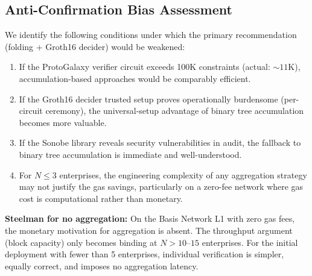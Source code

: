 \subsection{Anti-Confirmation Bias Assessment}

We identify the following conditions under which the primary
recommendation (folding + Groth16 decider) would be weakened:

\begin{enumerate}
  \item If the ProtoGalaxy verifier circuit exceeds 100K constraints
    (actual: ${\sim}11$K), accumulation-based approaches would be
    comparably efficient.
  \item If the Groth16 decider trusted setup proves operationally
    burdensome (per-circuit ceremony), the universal-setup advantage of
    binary tree accumulation becomes more valuable.
  \item If the Sonobe library reveals security vulnerabilities in audit,
    the fallback to binary tree accumulation is immediate and
    well-understood.
  \item For $N \leq 3$ enterprises, the engineering complexity of any
    aggregation strategy may not justify the gas savings, particularly
    on a zero-fee network where gas cost is computational rather than
    monetary.
\end{enumerate}

\textbf{Steelman for no aggregation:} On the Basis Network L1 with zero
gas fees, the monetary motivation for aggregation is absent. The
throughput argument (block capacity) only becomes binding at
$N > 10$--$15$ enterprises. For the initial deployment with fewer than
5 enterprises, individual verification is simpler, equally correct, and
imposes no aggregation latency.
